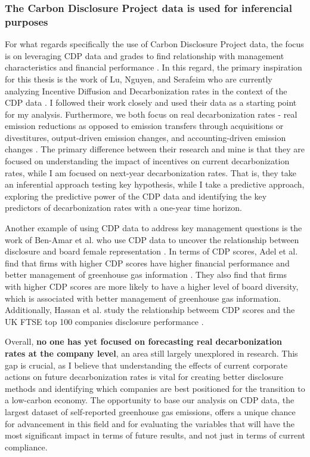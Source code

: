 \subsubsection{The Carbon Disclosure Project data is used for inferencial purposes}
For what regards specifically the use of Carbon Disclosure Project data, the focus is on leveraging CDP data and grades to find relationship with management characteristics and financial performance \cite{nguyen-ml,ben-amar,teob,Hassan2013Carbon}. In this regard, the primary inspiration for this thesis is the work of Lu, Nguyen, and Serafeim who are currently analyzing Incentive Diffusion and Decarbonization rates in the context of the CDP data \cite{incentive-diffusion}. I followed their work closely and used their data as a starting point for my analysis. Furthermore, we both focus on real decarbonization rates - real emission reductions as opposed to emission transfers through acquisitions or divestitures, output-driven emission changes, and accounting-driven emission changes \cite{incentive-diffusion}. The primary difference between their research and mine is that they are focused on understanding the impact of incentives on current decarbonization rates, while I am focused on next-year decarbonization rates. That is, they take an inferential approach testing key hypothesis, while I take a predictive approach, exploring the predictive power of the CDP data and identifying the key predictors of decarbonization rates with a one-year time horizon. 


Another example of using CDP data to address key management questions is the work of Ben-Amar et al. who use CDP data to uncover the relationship between disclosure and board female representation \cite{ben-amar}. In terms of CDP scores, Adel et al. find that firms with higher CDP scores have higher financial performance and better management of greenhouse gas information \cite{teob}. They also find that firms with higher CDP scores are more likely to have a higher level of board diversity, which is associated with better management of greenhouse gas information. Additionally, Hassan et al. study the relationship betweem CDP scores and the UK FTSE top 100 companies disclosure performance \cite{Hassan2013Carbon} .


Overall, \textbf{no one has yet focused on forecasting real decarbonization rates at the company level}, an area still largely unexplored in research. This gap is crucial, as I believe that understanding the effects of current corporate actions on future decarbonization rates is vital for creating better disclosure methods and identifying which companies are best positioned for the transition to a low-carbon economy. The opportunity to base our analysis on CDP data, the largest dataset of self-reported greenhouse gas emissions, offers a unique chance for advancement in this field and for evaluating the variables that will have the most significant impact in terms of future results, and not just in terms of current compliance. 

